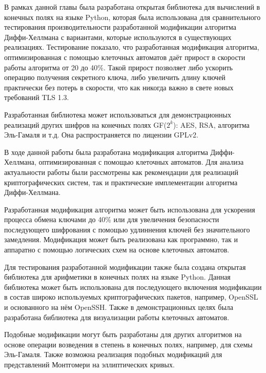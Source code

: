 \documentclass[times,specification,annotation]{itmo-student-thesis}
\begin{document}
\chapterconclusion

В рамках данной главы была разработана открытая библиотека для вычислений в конечных полях на языке Python,
которая была использована для сравнительного тестирования производительности разработанной модификации
алгоритма Диффи-Хеллмана с вариантами, которые используются в существующих реализациях.
Тестирование показало, что разработанная модификация алгоритма, оптимизированная с помощью клеточных автоматов даёт
прирост в скорости работы алгоритма от 20 до 40\%.
Такой прирост позволяет либо ускорить операцию получения секретного ключа, либо увеличить длину ключей практически без
потерь в скорости, что как никогда важно в свете новых требований TLS 1.3.

Разработанная библиотека может использоваться для демонстрационных реализаций других шифров на конечных полях GF($2^k$):
AES, RSA, алгоритма Эль-Гамаля и т.д.
Она распространяется по лицензии GPLv2.

\startconclusionpage

В ходе данной работы была разработана модификация алгоритма Диффи-Хеллмана, оптимизированная с помощью клеточных автоматов.
Для анализа актуальности работы были рассмотрены как рекомендации для реализаций криптографических систем,
так и практические имплементации алгоритма Диффи-Хеллмана.

Разработанная модификация алгоритма может быть использована для ускорения процесса обмена ключами до 40\% или для
увеличения безопасности последующего шифрования с помощью удлиннения ключей без значительного замедления.
Модификация может быть реализована как программно, так и аппаратно с помощью логических схем на основе клеточных автоматов.

Для тестирования разработанной модификации также была создана открытая библиотека для арифметики в конечных полях на языке Python.
Данная библиотека может быть использована для последующего включения модификации в состав широко используемых
криптографических пакетов, например, OpenSSL и основанного на нём OpenSSH.
Также в демонстрационных целях была разработана библиотека для визуализации работы клеточных автоматов.

Подобные модификации могут быть разработаны для других алгоритмов на основе операции возведения в степень в конечных полях,
например, для схемы Эль-Гамаля.
Также возможна реализация подобных модификаций для представлений Монтгомери на эллиптических кривых.

\printmainbibliography
\end{document}
